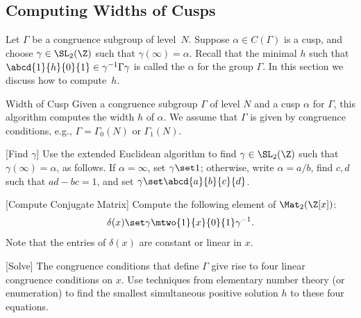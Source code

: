 \subsection{Computing Widths of Cusps}\label{sec:cuspwidth}
Let $\Gamma$ be a congruence subgroup of level~$N$.  Suppose
$\alpha\in C(\Gamma)$ is a cusp, and choose $\gamma\in\SL_2(\Z)$ such
that $\gamma(\infty)=\alpha$.  Recall that the minimal $h$ such that
$\abcd{1}{h}{0}{1} \in \gamma^{-1}\Gamma\gamma$ is called the
 $\alpha$ for the group $\Gamma$.  In this
section we discuss how to compute~$h$.

\begin{algorithm}{Width of Cusp}\label{alg:cuspwidth}
  Given a congruence subgroup $\Gamma$ of level $N$ and a cusp
  $\alpha$ for $\Gamma$, this algorithm computes the width $h$ of
  $\alpha$.  We assume that $\Gamma$ is given by congruence conditions,
e.g., $\Gamma=\Gamma_0(N)$ or $\Gamma_1(N)$.
\begin{steps}
\item{}[Find $\gamma$] Use the extended Euclidean algorithm
to find $\gamma\in\SL_2(\Z)$ such that $\gamma(\infty)=\alpha$,
as follows.
If $\alpha=\infty$, set $\gamma\set 1$; otherwise, write 
$\alpha=a/b$, find $c,d$ such that $ad-bc=1$, and set
$\gamma \set \abcd{a}{b}{c}{d}$.
\item{}[Compute Conjugate Matrix] Compute the following element of
$\Mat_2(\Z[x])$:
$$
  \delta(x) \set \gamma \mtwo{1}{x}{0}{1} \gamma^{-1}.
$$
Note that the entries of $\delta(x)$ are constant or
linear in $x$.
\item{}[Solve] The congruence conditions that define $\Gamma$ give
  rise to four linear congruence conditions on $x$.  Use techniques
  from elementary number theory (or enumeration) to find the smallest
  simultaneous positive solution $h$ to these four equations.
\end{steps}
\end{algorithm}


